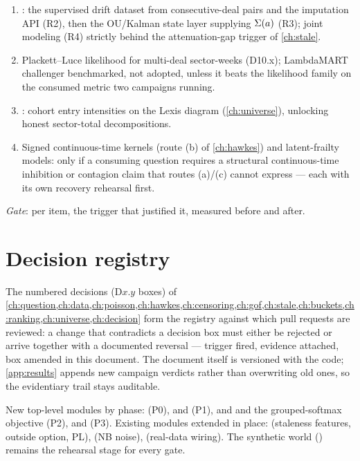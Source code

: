 \begin{enumerate}[label=P3.\arabic*,leftmargin=3.2em]
\item {}: the supervised drift dataset from
consecutive-deal pairs and the imputation API (R2), then the OU/Kalman
state layer supplying $\Sigma(a)$ (R3); joint modeling (R4)
strictly behind the attenuation-gap trigger of \cref{ch:stale}.
\item Plackett--Luce likelihood for multi-deal sector-weeks (D10.x);
LambdaMART challenger benchmarked, not adopted, unless it beats the
likelihood family on the consumed metric two campaigns running.
\item {}: cohort entry intensities on the Lexis
diagram (\cref{ch:universe}), unlocking honest sector-total decompositions.
\item Signed continuous-time kernels (route (b) of \cref{ch:hawkes})
and latent-frailty models: only if a consuming question requires a
structural continuous-time inhibition or contagion claim that routes
(a)/(c) cannot express --- each with its own recovery rehearsal first.
\end{enumerate}

\emph{Gate}: per item, the trigger that justified it, measured before
and after.

\section{Decision registry}\label{ch13:sec:registry}

The numbered decisions (D$x$.$y$ boxes) of
\cref{ch:question,ch:data,ch:poisson,ch:hawkes,ch:censoring,ch:gof,ch:stale,ch:buckets,ch:ranking,ch:universe,ch:decision}
form the registry against which pull requests are reviewed: a change
that contradicts a decision box must either be rejected or arrive
together with a documented reversal --- trigger fired, evidence
attached, box amended in this document. The document itself is
versioned with the code; \cref{app:results} appends new campaign
verdicts rather than overwriting old ones, so the evidentiary trail
stays auditable.

\begin{codehooks}
New top-level modules by phase:  (P0),
 and  (P1),
 and  and the grouped-softmax
objective (P2),  and  (P3).
Existing modules extended in place: 
(staleness features, outside option, PL), 
(NB noise),  (real-data wiring). The synthetic world
() remains the rehearsal stage for every gate.
\end{codehooks}
